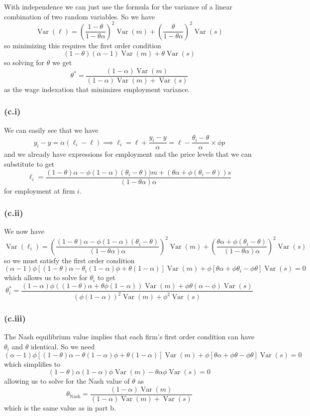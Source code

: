 \documentclass[11pt]{amsart}
\begin{document}
With independence we can just use the formula for the variance of a linear combination of two random variables. So we have
\[
\operatorname{Var}(\ell) = \left(\frac{1-\theta}{1-\theta \alpha}\right)^2 \operatorname{Var}(m) + \left(\frac{\theta}{1-\theta \alpha}\right)^2 \operatorname{Var}(s)
\]
so minimizing this requires the first order condition
\[
(1-\theta)(\alpha-1) \operatorname{Var}(m) + \theta \operatorname{Var}(s)
\]
so solving for $\theta$ we get
\[
\theta^* = \frac{(1-\alpha) \operatorname{Var}(m)}{(1-\alpha) \operatorname{Var}(m) + \operatorname{Var}(s)}
\]
as the wage indexation that minimizes employment variance.

\subsubsection*{(c.i)}

We can easily see that we have
\[
y_i - y = \alpha (\ell_i - \ell) \implies \ell_i = \ell + \frac{y_i - y}{\alpha} = \ell - \frac{\theta_i - \theta}{\alpha} \times \phi p
\]
and we already have expressions for employment and the price levels that we can substitute to get
\[
\ell_i = \frac{(1-\theta) \alpha - \phi (1-\alpha) (\theta_i - \theta)) m + (\theta \alpha + \phi (\theta_i - \theta)) s}{(1-\theta \alpha) \alpha}
\]
for employment at firm $i$.

\subsubsection*{(c.ii)}

We now have
\[
\operatorname{Var}(\ell_i) = \left(\frac{(1-\theta) \alpha - \phi (1-\alpha) (\theta_i - \theta)}{(1-\theta \alpha) \alpha}\right)^2 \operatorname{Var}(m) + \left(\frac{\theta \alpha + \phi (\theta_i - \theta)}{(1-\theta \alpha) \alpha}\right)^2 \operatorname{Var}(s)
\]
so we must satisfy the first order condition
\[
(\alpha - 1) \phi [(1-\theta) \alpha - \theta_i (1-\alpha) \phi + \theta (1-\alpha)] \operatorname{Var}(m) + \phi[\theta \alpha + \phi \theta_i - \phi \theta] \operatorname{Var}(s) = 0
\]
which allows us to solve for $\theta_i$ to get
\[
\theta_i^* = \frac{(1-\alpha) \phi ((1-\theta)\alpha + \theta \phi (1-\alpha)) \operatorname{Var}(m) + \phi \theta(\alpha - \phi) \operatorname{Var}(s)}{(\phi(1-\alpha))^2 \operatorname{Var}(m) + \phi^2 \operatorname{Var}(s)}
\]

\subsubsection*{(c.iii)}

The Nash equilibrium value implies that each firm's first order condition can have $\theta_i$ and $\theta$ identical. So we need 
\[
(\alpha - 1) \phi [(1-\theta) \alpha - \theta (1-\alpha) \phi + \theta (1-\alpha)] \operatorname{Var}(m) + \phi[\theta \alpha + \phi \theta - \phi \theta] \operatorname{Var}(s) = 0
\]
which simplifies to 
\[
(1-\theta) \alpha (1 - \alpha) \phi \operatorname{Var}(m) - \theta \alpha \phi \operatorname{Var}(s) = 0
\]
allowing us to solve for the Nash value of $\theta$ as
\[
\theta_{\text{Nash}} = \frac{(1-\alpha) \operatorname{Var}(m)}{(1-\alpha) \operatorname{Var}(m) + \operatorname{Var}(s)}
\]
which is the same value as in part b.
\end{document}
